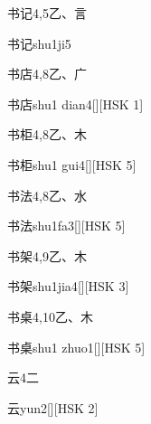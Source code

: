 \begin{entry}{书记}{4,5}{⼄、⾔}
  \begin{phonetics}{书记}{shu1ji5}
  \end{phonetics}
\end{entry}

\begin{entry}{书店}{4,8}{⼄、⼴}
  \begin{phonetics}{书店}{shu1 dian4}[][HSK 1]
  \end{phonetics}
\end{entry}

\begin{entry}{书柜}{4,8}{⼄、⽊}
  \begin{phonetics}{书柜}{shu1 gui4}[][HSK 5]
  \end{phonetics}
\end{entry}

\begin{entry}{书法}{4,8}{⼄、⽔}
  \begin{phonetics}{书法}{shu1fa3}[][HSK 5]
  \end{phonetics}
\end{entry}

\begin{entry}{书架}{4,9}{⼄、⽊}
  \begin{phonetics}{书架}{shu1jia4}[][HSK 3]
  \end{phonetics}
\end{entry}

\begin{entry}{书桌}{4,10}{⼄、⽊}
  \begin{phonetics}{书桌}{shu1 zhuo1}[][HSK 5]
  \end{phonetics}
\end{entry}

\begin{entry}{云}{4}{⼆}
  \begin{phonetics}{云}{yun2}[][HSK 2]
  \end{phonetics}
\end{entry}

